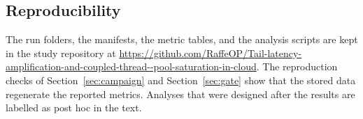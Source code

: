 \subsection{Reproducibility}

The run folders, the manifests, the metric tables, and the analysis scripts are kept in the study repository at \url{https://github.com/RaffeOP/Tail-latency-amplification-and-coupled-thread--pool-saturation-in-cloud}. The reproduction checks of Section~\ref{sec:campaign} and Section~\ref{sec:gate} show that the stored data regenerate the reported metrics. Analyses that were designed after the results are labelled as post hoc in the text.
